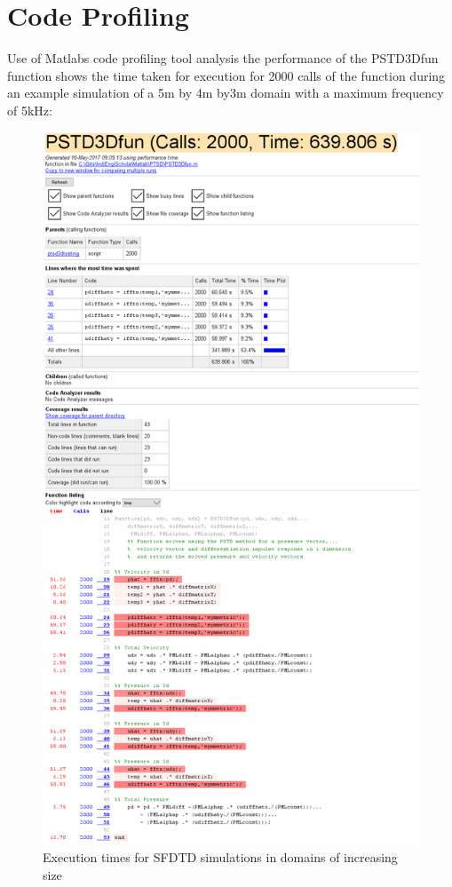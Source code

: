 \section{Code Profiling}
Use of Matlabs code profiling tool analysis the performance of the PSTD3Dfun function shows the time taken for execution for 2000 calls of the function during an example simulation of a 5m by 4m by3m domain with a maximum frequency of 5kHz:\\
\begin{figure}[H]
\centering
  \includegraphics[width=\textwidth]{./graphics/pstdfunctioncodeprofile.png}
  \caption{Execution times for SFDTD simulations in domains of increasing size}
\end{figure}
